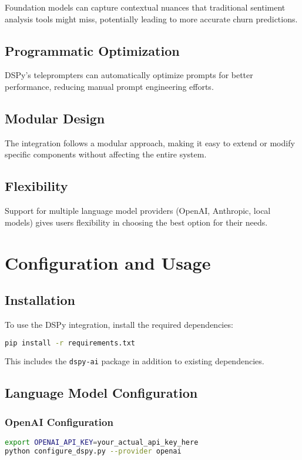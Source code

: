 \documentclass[11pt]{article}
\begin{document}
Foundation models can capture contextual nuances that traditional sentiment analysis tools might miss, potentially leading to more accurate churn predictions.

\subsection{Programmatic Optimization}

DSPy's teleprompters can automatically optimize prompts for better performance, reducing manual prompt engineering efforts.

\subsection{Modular Design}

The integration follows a modular approach, making it easy to extend or modify specific components without affecting the entire system.

\subsection{Flexibility}

Support for multiple language model providers (OpenAI, Anthropic, local models) gives users flexibility in choosing the best option for their needs.

\section{Configuration and Usage}

\subsection{Installation}

To use the DSPy integration, install the required dependencies:

\begin{lstlisting}[language=bash]
pip install -r requirements.txt
\end{lstlisting}

This includes the \texttt{dspy-ai} package in addition to existing dependencies.

\subsection{Language Model Configuration}

\subsubsection{OpenAI Configuration}
\begin{lstlisting}[language=bash]
export OPENAI_API_KEY=your_actual_api_key_here
python configure_dspy.py --provider openai
\end{lstlisting}
\end{document}
